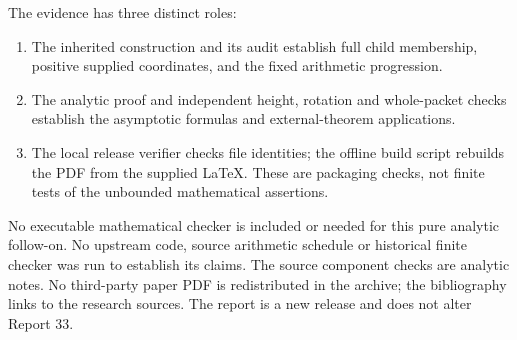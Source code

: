 \documentclass[11pt,letterpaper]{article}
\theoremstyle{definition}\newtheorem{definition}[theorem]{Definition}
\theoremstyle{remark}\newtheorem{remark}[theorem]{Remark}
\begin{document}
The evidence has three distinct roles:
\begin{enumerate}
\item The inherited construction and its audit establish full child membership, positive supplied coordinates, and the fixed arithmetic progression.
\item The analytic proof and independent height, rotation and whole-packet checks establish the asymptotic formulas and external-theorem applications.
\item The local release verifier checks file identities; the offline build script rebuilds the PDF from the supplied LaTeX. These are packaging checks, not finite tests of the unbounded mathematical assertions.
\end{enumerate}
No executable mathematical checker is included or needed for this pure analytic follow-on. No upstream code, source arithmetic schedule or historical finite checker was run to establish its claims. The source component checks are analytic notes. No third-party paper PDF is redistributed in the archive; the bibliography links to the research sources. The report is a new release and does not alter Report 33.
\end{document}
